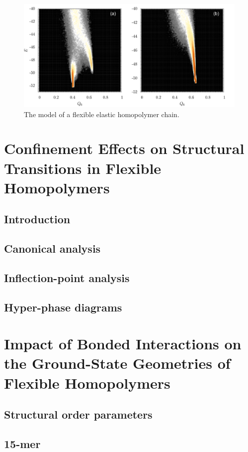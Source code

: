 \documentclass[12pt]{report}
\begin{document}
%
\begin{figure}
\center
\includegraphics[width = 1.01\textwidth]{chapter4Figs/q6.pdf}
\caption{\label{fig:potentials}%
The model of a flexible elastic homopolymer chain.
}
\end{figure}
% 



\chapter{Confinement Effects on Structural Transitions in Flexible Homopolymers}
\section{Introduction}
\section{Canonical analysis}
\section{Inflection-point analysis}
\section{Hyper-phase diagrams}

\chapter{Impact of Bonded Interactions on the Ground-State Geometries of Flexible Homopolymers}
\section{Structural order parameters}
\section{15-mer}
\end{document}
